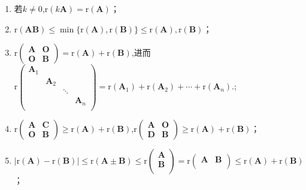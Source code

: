 \documentclass[../../main.tex]{subfiles}%
\begin{document}
\begin{proposition}[矩阵秩的基本公式]\label{proposition:矩阵秩的基本公式}
\begin{enumerate}[(1)]
\item \label{proposition:矩阵秩的基本公式-1}若\(k\neq0\),\(\mathrm{r}(k\boldsymbol{A})=\mathrm{r}(\boldsymbol{A})\)；

\item \label{proposition:矩阵秩的基本公式-2}\(\mathrm{r}(\boldsymbol{A}\boldsymbol{B})\leqslant \min\{\mathrm{r}(\boldsymbol{A}),\mathrm{r}(\boldsymbol{B})\}\leqslant \mathrm{r}(\boldsymbol{A}),\mathrm{r}(\boldsymbol{B})\)；

\item \label{proposition:矩阵秩的基本公式-3}\(\mathrm{r}\begin{pmatrix}\boldsymbol{A}&\boldsymbol{O}\\\boldsymbol{O}&\boldsymbol{B}\end{pmatrix}=\mathrm{r}(\boldsymbol{A})+\mathrm{r}(\boldsymbol{B})\),进而$\mathrm{r}\left( \begin{matrix}
\boldsymbol{A}_1&		&		&		\\
&		\boldsymbol{A}_2&		&		\\
&		&		\ddots&		\\
&		&		&		\boldsymbol{A}_n\\
\end{matrix} \right) =\mathrm{r}\left( \boldsymbol{A}_1 \right) +\mathrm{r}\left( \boldsymbol{A}_2 \right) +\cdots +\mathrm{r}\left( \boldsymbol{A}_n \right) .$;

\item \label{proposition:矩阵秩的基本公式-4}\(\mathrm{r}\begin{pmatrix}\boldsymbol{A}&\boldsymbol{C}\\\boldsymbol{O}&\boldsymbol{B}\end{pmatrix}\geqslant \mathrm{r}(\boldsymbol{A})+\mathrm{r}(\boldsymbol{B})\),\(\mathrm{r}\begin{pmatrix}\boldsymbol{A}&\boldsymbol{O}\\\boldsymbol{D}&\boldsymbol{B}\end{pmatrix}\geqslant \mathrm{r}(\boldsymbol{A})+\mathrm{r}(\boldsymbol{B})\)；

\item \label{proposition:矩阵秩的基本公式-5}\(|\mathrm{r}(\boldsymbol{A})-\mathrm{r}(\boldsymbol{B})|\leqslant \mathrm{r}\left( \boldsymbol{A}\pm \boldsymbol{B} \right) \leqslant \mathrm{r}\left( \begin{array}{c}
\boldsymbol{A}\\
\boldsymbol{B}\\
\end{array} \right) =\mathrm{r}\left( \begin{matrix}
\boldsymbol{A}&		\boldsymbol{B}\\
\end{matrix} \right) \leqslant \mathrm{r}\left( \boldsymbol{A} \right) +\mathrm{r}\left( \boldsymbol{B} \right) \)；


\end{enumerate}
\end{proposition}
\end{document}
